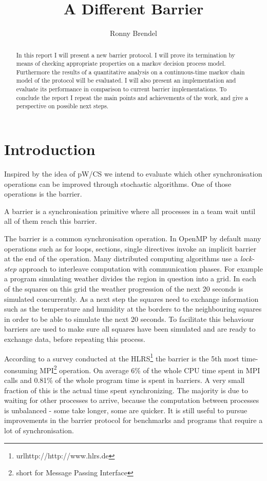 \documentclass[a4paper, 10pt]{article}
\title{A Different Barrier}
\author{Ronny Brendel}
\begin{document}
\maketitle

\begin{abstract}
	In this report I will present a new barrier protocol. I will prove its termination by means of checking appropriate properties on a markov decision process model. Furthermore the results of a quantitative analysis on a continuous-time markov chain model of the protocol will be evaluated. I will also present an implementation and evaluate its performance in comparison to current barrier implementations. To conclude the report I repeat the main points and achievements of the work, and give a perspective on possible next steps.
\end{abstract}

\section{Introduction}
Inspired by the idea of pW/CS\cite{pwcs} we intend to evaluate which other synchronisation operations can be improved through stochastic algorithms. One of those operations is the barrier.

A barrier is a synchronisation primitive where all processes in a team wait until all of them reach this barrier.

The barrier is a common synchronisation operation. In OpenMP\cite{omp} by default many operations such as for loops, sections, single directives invoke an implicit barrier at the end of the operation. Many distributed computing algorithms use a \emph{lock-step} approach to interleave computation with communication phases. For example a program simulating weather divides the region in question into a grid. In each of the squares on this grid the weather progression of the next 20 seconds is simulated concurrently. As a next step the squares need to exchange information such as the temperature and humidity at the borders to the neighbouring squares in order to be able to simulate the next 20 seconds. To facilitate this behaviour barriers are used to make sure all squares have been simulated and are ready to exchange data, before repeating this process.

According to a survey conducted at the HLRS\footnote{url{http://http://www.hlrs.de}}\cite{rab00} the barrier is the 5th most time-consuming MPI\footnote{short for Message Passing Interface}\cite{mpi} operation. On average 6\% of the whole CPU time spent in MPI calls and 0.81\% of the whole program time is spent in barriers. A very small fraction of this is the actual time spent synchronizing. The majority is due to waiting for other processes to arrive, because the computation between processes is unbalanced - some take longer, some are quicker. It is still useful to pursue improvements in the barrier protocol for benchmarks and programs that require a lot of synchronisation.
\end{document}
